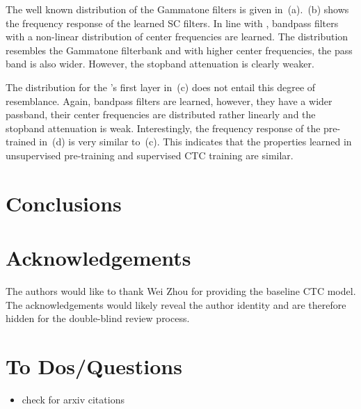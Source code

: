 \documentclass{INTERSPEECH2023}
\begin{document}
The well known distribution of the Gammatone filters is given in \,(a).
\,(b) shows the frequency response of the learned \gls{SC} filters.
In line with \cite{tuske2018:waveform}, bandpass filters with a non-linear distribution of center frequencies are learned.
The distribution resembles the Gammatone filterbank and with higher center frequencies, the pass band is also wider.
However, the stopband attenuation is clearly weaker.

The distribution for the \wvtwo \fe's first layer in \,(c) does not entail this degree of resemblance.
Again, bandpass filters are learned, however, they have a wider passband, their center frequencies are distributed rather linearly and the stopband attenuation is weak.
Interestingly, the frequency response of the pre-trained \wvtwo \fe in \,(d) is very similar to \,(c).
This indicates that the properties learned in unsupervised pre-training and supervised \gls{CTC} training are similar.

\section{Conclusions}

\section{Acknowledgements}

\ifinterspeechfinal
     The authors would like to thank Wei Zhou for providing the baseline \gls{CTC} model.
\else
     The acknowledgements would likely reveal the author identity and are therefore hidden for the double-blind review process.
\fi

{
\color{red}
\section{To Dos/Questions}
\begin{itemize}
  \item check for arxiv citations
\end{itemize}
}



\end{document}
